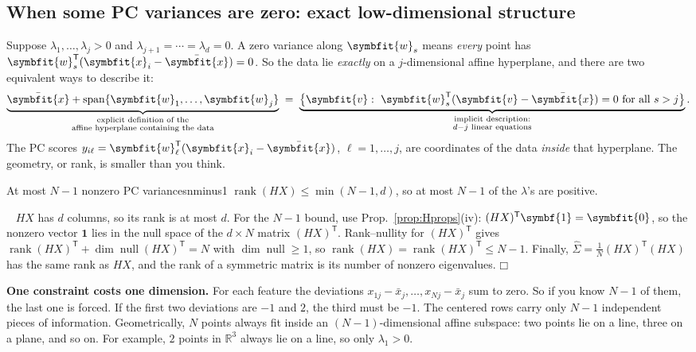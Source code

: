 \documentclass[11pt]{article}
\newcommand{\bm}[1]{\symbfit{#1}}
\newenvironment{proofsketch}{\par\noindent{\itshape Proof.}\ }{\hfill$\mdlgwhtsquare$\par}
\newcommand{\R}{\mathbb{R}}
\newcommand{\vx}{\bm{x}}
\newcommand{\vw}{\bm{w}}
\newcommand{\one}{\symbf{1}}
\newcommand{\xbar}{\bar{\bm{x}}}
\newcommand{\Sig}{\widehat{\Sigma}}
\newcommand{\T}{^{\mathsf T}}
\newcommand{\rank}{\operatorname{rank}}
\newcommand{\spn}{\operatorname{span}}
\begin{document}
\subsection{When some PC variances are zero: exact low-dimensional structure}

Suppose $\lambda_1,\dots,\lambda_j>0$ and $\lambda_{j+1}=\cdots=\lambda_d=0$. A zero
variance along $\vw_s$ means \emph{every} point has $\vw_s\T(\vx_i-\xbar)=0$. So the
data lie \emph{exactly} on a $j$-dimensional affine hyperplane, and there are two
equivalent ways to describe it:
\[
\underbrace{\xbar+\spn\{\vw_1,\dots,\vw_j\}}_{\substack{\text{explicit definition of the}\\\text{affine hyperplane containing the data}}}
\;=\;
\underbrace{\big\{\bm v:\ \vw_s\T(\bm v-\xbar)=0\ \text{for all } s>j\big\}}_{\substack{\text{implicit description:}\\ d-j \text{ linear equations}}} .
\]
The PC scores $y_{i\ell}=\vw_\ell\T(\vx_i-\xbar)$, $\ell=1,\dots,j$, are coordinates of the data
\emph{inside} that hyperplane. The geometry, or rank, is smaller than you think.

\begin{proposition}{At most $N-1$ nonzero PC variances}{nminus1}
$\rank(HX)\le\min(N-1,d)$, so at most $N-1$ of the $\lambda$'s are positive.
\end{proposition}
\begin{proofsketch}
$HX$ has $d$ columns, so its rank is at most $d$. For the $N-1$ bound, use
Prop.~\ref{prop:Hprops}(iv): $(HX)\T\one=\bm0$, so the nonzero vector $\one$ lies in
the null space of the $d\times N$ matrix $(HX)\T$. Rank--nullity for $(HX)\T$ gives
$\rank(HX)\T+\dim\operatorname{null}(HX)\T=N$ with $\dim\operatorname{null}\ge1$, so
$\rank(HX)=\rank(HX)\T\le N-1$. Finally, $\Sig=\tfrac1N(HX)\T(HX)$ has the same rank as
$HX$, and the rank of a symmetric matrix is its number of nonzero eigenvalues.
\end{proofsketch}

\begin{intuition}
\textbf{One constraint costs one dimension.} For each feature the deviations
$x_{1j}-\bar x_j,\dots,x_{Nj}-\bar x_j$ sum to zero. So if you know $N-1$ of them, the
last one is forced. If the first two deviations are $-1$ and $2$, the third must be
$-1$. The centered rows carry only $N-1$ independent pieces of information. Geometrically,
$N$ points always fit inside an $(N-1)$-dimensional affine subspace: two points lie on a
line, three on a plane, and so on. For example, $2$ points in $\R^3$ always lie on a line,
so only $\lambda_1>0$.
\end{intuition}
\end{document}
